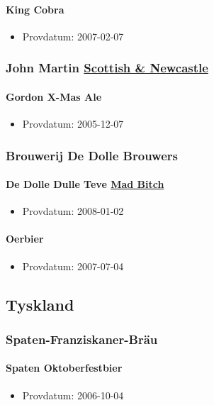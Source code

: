 \documentclass[11pt]{article}
\begin{document}
\paragraph{King Cobra}
\label{sec:org35bda19}
\begin{itemize}
\item Provdatum: 2007-02-07
\end{itemize}
\subsubsection{John Martin \underline{Scottish \& Newcastle}}
\label{sec:org8abd4b0}
\paragraph{Gordon X-Mas Ale}
\label{sec:orge4f4957}
\begin{itemize}
\item Provdatum: 2005-12-07
\end{itemize}
\subsubsection{Brouwerij De Dolle Brouwers}
\label{sec:org6676a75}
\paragraph{De Dolle Dulle Teve \underline{Mad Bitch}}
\label{sec:orge094f8a}
\begin{itemize}
\item Provdatum: 2008-01-02
\end{itemize}
\paragraph{Oerbier}
\label{sec:orgbf24c9a}
\begin{itemize}
\item Provdatum: 2007-07-04
\end{itemize}
\subsection{Tyskland}
\label{sec:orga3b4d5e}
\subsubsection{Spaten-Franziskaner-Bräu}
\label{sec:orgebd354b}
\paragraph{Spaten Oktoberfestbier}
\label{sec:orgbc725ce}
\begin{itemize}
\item Provdatum: 2006-10-04
\end{itemize}
\end{document}

